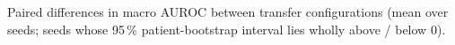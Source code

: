 \begin{table}[htbp]
\centering
\caption[Transfer from the ECG-GPT: paired differences]{Paired differences in macro AUROC between transfer configurations (mean over seeds; seeds whose 95\,\% patient-bootstrap interval lies wholly above / below 0).}
\label{tab:transfer_comparisons}
\small
\begin{adjustbox}{max width=\textwidth}

\end{adjustbox}
\end{table}

